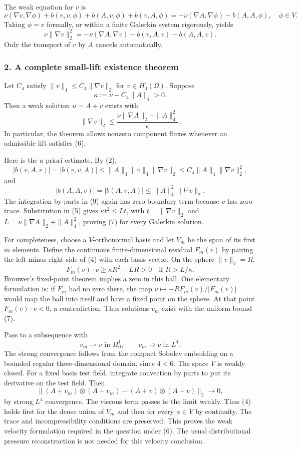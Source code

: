 \documentclass[11pt]{article}
\begin{document}
The weak equation for $v$ is
\[
 \nu(\nabla v,\nabla\phi)+b(v,v,\phi)+b(A,v,\phi)
 +b(v,A,\phi)
 =-\nu(\nabla A,\nabla\phi)-b(A,A,\phi),\quad\phi\in V.
                                                               \tag{4}
\]
Taking $\phi=v$ formally, or within a finite Galerkin system rigorously, yields
\[
 \nu\|\nabla v\|_2^2
 =-\nu(\nabla A,\nabla v)-b(v,A,v)-b(A,A,v).               \tag{5}
\]
Only the transport of $v$ by $A$ cancels automatically.

\subsubsection{2. A complete small-lift existence theorem}
Let $C_4$ satisfy $\|v\|_4\leq C_4\|\nabla v\|_2$ for $v\in H^1_0(\Omega)$. Suppose
\[
 \kappa:=\nu-C_4\|A\|_4>0.                              \tag{6}
\]
Then a weak solution $u=A+v$ exists with
\[
 \|\nabla v\|_2\leq
 \frac{\nu\|\nabla A\|_2+\|A\|_4^2}{\kappa}.             \tag{7}
\]
In particular, the theorem allows nonzero component fluxes whenever an admissible lift satisfies (6).

Here is the a priori estimate. By (2),
\[
 |b(v,A,v)|=|b(v,v,A)|
 \leq \|A\|_4\|v\|_4\|\nabla v\|_2
 \leq C_4\|A\|_4\|\nabla v\|_2^2,                       \tag{8}
\]
and
\[
 |b(A,A,v)|=|b(A,v,A)|\leq\|A\|_4^2\|\nabla v\|_2.       \tag{9}
\]
The integration by parts in (9) again has zero boundary term because $v$ has zero trace. Substitution in (5) gives $\kappa t^2\leq Lt$, with $t=\|\nabla v\|_2$ and $L=\nu\|\nabla A\|_2+\|A\|_4^2$, proving (7) for every Galerkin solution.

For completeness, choose a $V$-orthonormal basis and let $V_m$ be the span of its first $m$ elements. Define the continuous finite-dimensional residual $F_m(v)$ by pairing the left minus right side of (4) with each basis vector. On the sphere $\|v\|_V=R$,
\[
 F_m(v)\cdot v\geq\kappa R^2-LR>0
 \quad\text{if }R>L/\kappa.
\]
Brouwer's fixed-point theorem implies a zero in this ball. One elementary formulation is: if $F_m$ had no zero there, the map $v\mapsto-RF_m(v)/|F_m(v)|$ would map the ball into itself and have a fixed point on the sphere. At that point $F_m(v)\cdot v<0$, a contradiction. Thus solutions $v_m$ exist with the uniform bound (7).

Pass to a subsequence with
\[
 v_m\rightharpoonup v\text{ in }H^1_0,
 \qquad v_m\longrightarrow v\text{ in }L^4.
                                                               \tag{10}
\]
The strong convergence follows from the compact Sobolev embedding on a bounded regular three-dimensional domain, since $4<6$. The space $V$ is weakly closed. For a fixed basis test field, integrate convection by parts to put its derivative on the test field. Then
\[
 \|(A+v_m)\otimes(A+v_m)-(A+v)\otimes(A+v)\|_2\to0,
\]
by strong $L^4$ convergence. The viscous term passes to the limit weakly. Thus (4) holds first for the dense union of $V_m$ and then for every $\phi\in V$ by continuity. The trace and incompressibility conditions are preserved. This proves the weak velocity formulation required in the question under (6). The usual distributional pressure reconstruction is not needed for this velocity conclusion.
\end{document}
